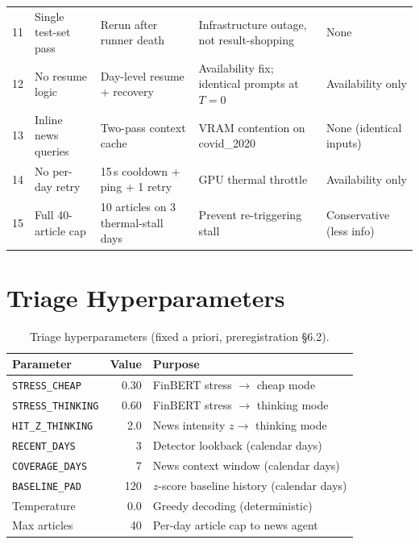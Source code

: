 \documentclass[10pt,a4paper]{article}
\begin{document}
\begin{table}[htbp]
\begin{tabular}{@{}p{0.5cm} p{3.1cm} p{3.3cm} p{4.2cm} p{3.2cm}@{}}
11 & Single test-set pass & Rerun after runner death & Infrastructure outage,
    not result-shopping & None \\
12 & No resume logic & Day-level resume + recovery & Availability fix; identical
    prompts at $T = 0$ & Availability only \\
13 & Inline news queries & Two-pass context cache & VRAM contention on
    covid\_2020 & None (identical inputs) \\
14 & No per-day retry & 15\,s cooldown + ping + 1 retry & GPU thermal throttle &
    Availability only \\
15 & Full 40-article cap & 10 articles on 3 thermal-stall days & Prevent
    re-triggering stall & Conservative (less info) \\
\bottomrule
\end{tabular}
\end{table}

\section{Triage Hyperparameters}\label{app:triage}

\begin{table}[htbp]
\centering
\footnotesize
\caption{Triage hyperparameters (fixed a priori, preregistration \S6.2).}
\begin{tabular}{lrl}
\toprule
Parameter & Value & Purpose \\
\midrule
\texttt{STRESS\_CHEAP}    & 0.30 & FinBERT stress $\to$ cheap mode \\
\texttt{STRESS\_THINKING} & 0.60 & FinBERT stress $\to$ thinking mode \\
\texttt{HIT\_Z\_THINKING} & 2.0  & News intensity $z \to$ thinking mode \\
\texttt{RECENT\_DAYS}     & 3    & Detector lookback (calendar days) \\
\texttt{COVERAGE\_DAYS}   & 7    & News context window (calendar days) \\
\texttt{BASELINE\_PAD}    & 120  & $z$-score baseline history (calendar days) \\
Temperature               & 0.0  & Greedy decoding (deterministic) \\
Max articles              & 40   & Per-day article cap to news agent \\
\bottomrule
\end{tabular}
\end{table}
\end{document}

